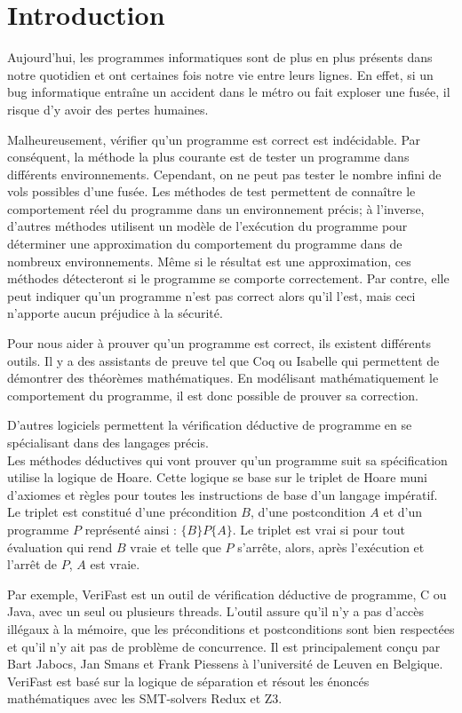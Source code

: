 \documentclass[9pt]{book}
\newcommand{\verifast}{VeriFast}
\begin{document}
\chapter*{Introduction}
		Aujourd'hui, les programmes informatiques sont de plus en plus pr\'esents dans notre quotidien et ont certaines fois notre vie entre leurs lignes. En effet, si un bug informatique entra\^ine un accident dans le m\'etro ou fait exploser une fus\'ee, il risque d'y avoir des pertes humaines. \par
		Malheureusement, v\'erifier qu'un programme est correct est ind\'ecidable. Par cons\'equent, la m\'ethode la plus courante est de tester un programme dans diff\'erents environnements. Cependant, on ne peut pas tester le nombre infini de vols possibles d'une fus\'ee. Les m\'ethodes de test permettent de conna\^itre le comportement r\'eel du programme dans un environnement pr\'ecis; \`a l'inverse, d'autres m\'ethodes utilisent un mod\`ele de l'ex\'ecution du programme pour d\'eterminer une approximation du comportement du programme dans de nombreux environnements. M\^eme si le r\'esultat est une approximation, ces m\'ethodes d\'etecteront si le programme se comporte correctement. Par contre, elle peut indiquer qu'un programme n'est pas correct alors qu'il l'est, mais ceci n'apporte aucun pr\'ejudice \`a la s\'ecurit\'e.
\par 

		Pour nous aider \`a prouver qu'un programme est correct, ils existent diff\'erents outils. Il y a des assistants de preuve tel que Coq ou Isabelle qui permettent de d\'emontrer des th\'eor\`emes math\'ematiques. En mod\'elisant math\'ematiquement le comportement du programme, il est donc possible de prouver sa correction. \par
		
	D'autres logiciels permettent la v\'erification d\'eductive de programme en se sp\'ecialisant dans des langages pr\'ecis. \\Les m\'ethodes d\'eductives qui vont prouver qu'un programme suit sa sp\'ecification utilise la logique de Hoare. Cette logique se base sur le triplet de Hoare muni d'axiomes et r\`egles pour toutes les instructions de base d'un langage imp\'eratif. Le triplet est constitu\'e d'une pr\'econdition $B$, d'une postcondition $A$ et d'un programme $P$ repr\'esent\'e ainsi : $\{B\}P\{A\}$. Le triplet est vrai si pour tout \'evaluation qui rend $B$ vraie et telle que $P$ s'arr\^ete, alors, apr\`es l'ex\'ecution et l'arr\^et de $P$, $A$ est vraie.\par Par exemple, \verifast{} est un outil de v\'erification d\'eductive de programme, C ou Java, avec un seul ou plusieurs threads. L'outil assure qu'il n'y a pas d'acc\`es ill\'egaux \`a la m\'emoire, que les pr\'econditions et postconditions sont bien respect\'ees et qu'il n'y ait pas de probl\`eme de concurrence. Il est principalement con\c{c}u par Bart Jabocs, Jan Smans et Frank Piessens \`a l'universit\'e de Leuven en Belgique. \verifast{} est bas\'e sur la logique de s\'eparation et r\'esout les \'enonc\'es math\'ematiques avec les SMT-solvers Redux et Z3.\par
	
\end{document}
